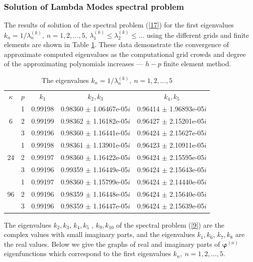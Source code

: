 \documentclass[authoryear]{elsarticle}
\begin{document}
\subsubsection{Solution of Lambda Modes spectral problem}
The results of solution of the spectral problem (\ref{17})  for the first eigenvalues $k_n = 1 / \lambda_n^{(k)}, \ n = 1,2, ..., 5, \ \lambda_1^{(k)} \leq \lambda_2^{(k)} \leq ...$ 
using the different grids and finite elements are shown in Table \ref{t-6}. These data demonstrate the convergence of approximate computed eigenvalues as the computational grid crowds and degree of the approximating polynomials increases --- $h-p$ finite element method.

\begin{table}[h]
\caption{The eigenvalues $k_n = 1 / \lambda_n^{(k)}, \ n = 1,2, ..., 5$}
\label{t-6}
\begin{center}
\begin{tabular}{ccccc}
\rowcolor{col1}
$\kappa$ & $p$ & $k_1$ &  $k_2, k_3$ &  $k_4,k_5$ \\ 
\rowcolor{col3}
   & 1 & 0.99198 & 0.98360 $\pm$ 1.06467e-05$i$  & 0.96414 $\pm$ 1.96893e-05$i$  \\
\rowcolor{col2}
 6 & 2 & 0.99199 & 0.98362 $\pm$ 1.16182e-05$i$  & 0.96427 $\pm$ 2.15201e-05$i$  \\
\rowcolor{col1}
   & 3 & 0.99196 & 0.98360 $\pm$ 1.16441e-05$i$  & 0.96424 $\pm$ 2.15627e-05$i$  \\
\rowcolor{col3}
   & 1 & 0.99198 & 0.98361 $\pm$ 1.13901e-05$i$  & 0.96423 $\pm$ 2.10911e-05$i$  \\
\rowcolor{col2}
24 & 2 & 0.99197 & 0.98360 $\pm$ 1.16422e-05$i$  & 0.96424 $\pm$ 2.15595e-05$i$  \\
\rowcolor{col1}
   & 3 & 0.99196 & 0.99359 $\pm$ 1.16449e-05$i$  & 0.96424 $\pm$ 2.15643e-05$i$  \\
\rowcolor{col3}
   & 1 & 0.99197 & 0.98360 $\pm$ 1.15799e-05$i$  & 0.96424 $\pm$ 2.14440e-05$i$  \\
\rowcolor{col2}
96 & 2 & 0.99196 & 0.98359 $\pm$ 1.16448e-05$i$  & 0.96424 $\pm$ 2.15640e-05$i$  \\
\rowcolor{col1}
   & 3 & 0.99196 & 0.98359 $\pm$ 1.16447e-05$i$  & 0.96424 $\pm$ 2.15639e-05$i$  \\
\end{tabular}
\end{center}
\end{table}

The eigenvalues $k_2, k_3$, $k_4, k_5$ , $k_9, k_{10}$ 
of the spectral problem (\ref{9}) are the complex values with small imaginary parts, and the eigenvalues $k_1, k_6$, $k_7, k_8$ are the real values.
Below we give the graphs of real and imaginary parts of $\bm \varphi^{(n)}$ eigenfunctions which correspond to the first eigenvalues $k_n, \ n = 1, 2, ..., 5$. 
\end{document}

